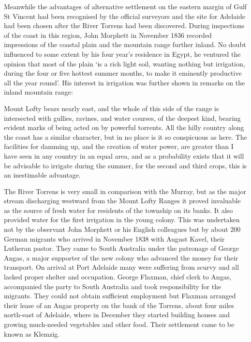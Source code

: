 Meanwhile the advantages of alternative settlement on the eastern
margin of Gulf St Vincent  had been
recognised by the official surveyors and the site for Adelaide
 had been chosen after the River Torrens
 had been discovered.  During inspections of the
coast in this region, John Morphett  in November
1836 recorded impressions of the coastal plain and the mountain range
further inland.  No doubt influenced to some extent by his four year's
residence in Egypt, he ventured the opinion that most of the plain `is
a rich light soil, wanting nothing but irrigation, during the four or
five hottest summer months, to make it eminently productive all the
year round'.  His interest in irrigation was further shown in remarks
on the inland mountain range:
\begin{Quote}
	Mount Lofty bears nearly east, and the whole of this side of
	the range is intersected with gullies, ravines, and water
	courses, of the deepest kind, bearing evident marks of being
	acted on by powerful torrents.  All the hilly country along
	the coast has a similar character, but in no place is it so
	conspicuous as here.  The facilities for damming up, and the
	creation of water power, are greater than I have seen in any
	country in an equal area, and as a probability exists that it
	will be advisable to irrigate during the summer, for the
	second and third crops, this is an inestimable
	advantage.
\end{Quote}

The River Torrens is very small in comparison with the Murray, but as
the major stream discharging westward from the Mount Lofty Rang\-es it
 proved invaluable as the source of
fresh water for residents of the township on its banks.  It also
provided water for the first irrigation in the young colony.  This was
undertaken not by the observant John Morphett or his English
colleagues but by about 200 German migrants who arrived in November
1838 with August Kavel,  their Lutheran pastor.  They
came to South Australia under the patronage of George Angas,
 a major supporter of the new colony who advanced the
money for their transport. On arrival at Port Adelaide many were
suffering from scurvy and all lacked proper
shelter and occupation. George Flaxman,   chief
clerk to Angas, accompanied the party to South Australia and took
responsibility for the migrants.  They could not obtain sufficient
employment but Flaxman arranged their lease of an Angas property on
the bank of the Torrens, about four miles north-east of Adelaide,
where in December they started building houses and growing much-needed
vegetables and other food.  Their settlement came to be known as
Klemzig. 

